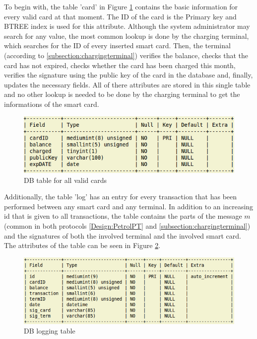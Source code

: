 \documentclass[a4paper,10pt]{llncs}
\begin{document}
To begin with, the table 'card' in Figure \ref{figure:dbtable_card} contains the basic information for every valid card at that moment. 
The ID of the card is the Primary key and BTREE index is used for this attribute. Although the system administrator may search 
for any value, the most common lookup is done by the charging terminal, which searches for the ID of every inserted smart card. Then, 
the terminal (according to \ref{subsection:chargingterminal}) verifies the balance, checks that the card has not  expired, 
checks whether the card has been charged this month, verifies the signature using the public key of the card in the database and, finally, 
updates the necessary fields. All of there attributes are stored in this single table and no other lookup is needed to be 
done by the charging terminal to get the informations of the smart card.
    \begin{figure}
    	\centering
    	\includegraphics[scale=0.38]{img/dbtable_card.png}
    	\caption{\label{figure:dbtable_card}DB table for all valid cards}
    \end{figure}
    
Additionally, the table 'log' has an entry for every transaction that has been performed between any smart card and any terminal. In addition to an increasing id that is given to all transactions, the table contains the parts of the message $m$ (common in both protocols \ref{Design:PetrolPT} and \ref{subsection:chargingterminal}) and the signatures of both the involved terminal and the involved smart card. The attributes of the table can be seen in Figure \ref{figure:dbtable_log}. 
    \begin{figure}
    	\centering
    	\includegraphics[scale=0.38]{img/dbtable_log.png}
    	\caption{\label{figure:dbtable_log}DB logging table}
    \end{figure}
    
\end{document}
